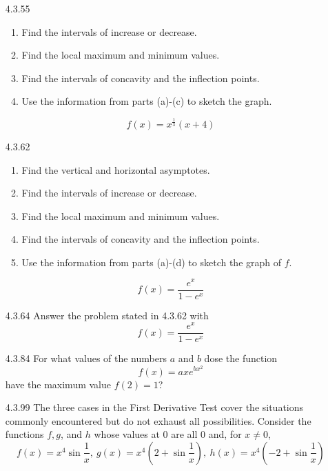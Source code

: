 \documentclass{article}
\begin{document}
\begin{enumerate}
\newpage

\item[4.3.55]
    \begin{enumerate}
        \item Find the intervals of increase or decrease.
        \item Find the local maximum and minimum values.
        \item Find the intervals of concavity and the inflection points.
        \item Use the information from parts (a)-(c) to sketch the graph.
    \end{enumerate}
    \[
        f(x) = x^{\frac{1}{3}} (x + 4)
    \]

\vspace{8cm}

\item[4.3.62]
    \begin{enumerate}
        \item Find the vertical and horizontal asymptotes.
        \item Find the intervals of increase or decrease.
        \item Find the local maximum and minimum values.
        \item Find the intervals of concavity and the inflection points.
        \item Use the information from parts (a)-(d) to sketch the graph of $f$.
    \end{enumerate}
    \[
        f(x) = \frac{e^{x}}{1-e^{x}}
    \]

\newpage

\item[4.3.64]
    Answer the problem stated in 4.3.62 with
    \[
        f(x) = \frac{e^{x}}{1-e^{x}}
    \]

\vspace{8cm}

\item[4.3.84]
    For what values of the numbers $a$ and $b$ dose the function
    \[
        f(x) = axe^{bx^{2}}
    \]
    have the maximum value $f(2) = 1$?

\newpage

\item[4.3.99]
    The three cases in the First Derivative Test cover the situations
    commonly encountered but do not exhaust all possibilities.
    Consider the functions $f,g$, and $h$ whose values at $0$ are all
    $0$ and, for $x \neq 0$,
    \[
        f(x) = x^{4} \sin \frac{1}{x} ,\
        g(x) = x^{4} \left( 2+\sin \frac{1}{x}  \right),\
        h(x) = x^{4} \left( -2 + \sin \frac{1}{x}  \right)
    \]


\end{enumerate}
\end{document}
